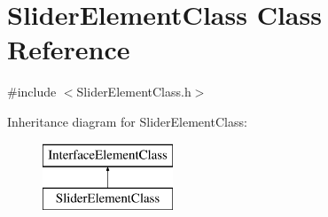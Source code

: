 \hypertarget{class_slider_element_class}{}\section{Slider\+Element\+Class Class Reference}
\label{class_slider_element_class}


{\ttfamily \#include $<$Slider\+Element\+Class.\+h$>$}

Inheritance diagram for Slider\+Element\+Class\+:\begin{figure}[H]
\begin{center}
\leavevmode
\includegraphics[height=2.000000cm]{class_slider_element_class}
\end{center}
\end{figure}

